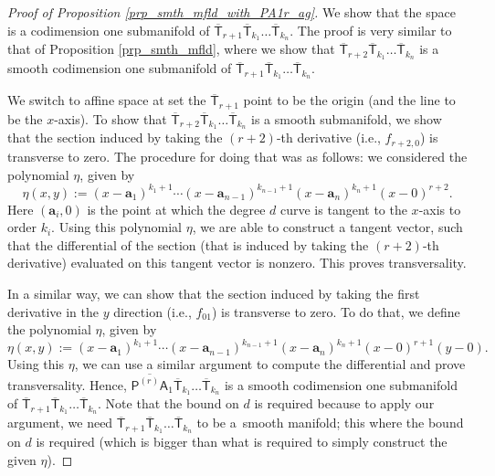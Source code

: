 \documentclass[pdftex]{sigma}
\numberwithin{equation}{section}
\begin{document}
\begin{proof}[Proof of Proposition \ref{prp_smth_mfld_with_PA1r_ag}]
We show that the space  is a codimension one submanifold of
$\overline{\mathsf{T}}_{r+1}\overline{\mathsf{T}}_{k_1}\dots \overline{\mathsf{T}}_{k_n}$.
The proof is very similar to
that of Proposition \ref{prp_smth_mfld}, where we
show that
$\overline{\mathsf{T}}_{r+2}\overline{\mathsf{T}}_{k_1}\dots \overline{\mathsf{T}}_{k_n}$
is a smooth codimension one submanifold
of $\overline{\mathsf{T}}_{r+1}\overline{\mathsf{T}}_{k_1}\dots \overline{\mathsf{T}}_{k_n}$.

We switch to affine space at set the $\overline{\mathsf{T}}_{r+1}$ point to be the origin
(and the line to be the $x$-axis). To show that
$\overline{\mathsf{T}}_{r+2}\overline{\mathsf{T}}_{k_1}\dots \overline{\mathsf{T}}_{k_n}$
is a smooth submanifold, we show that the section induced by taking the $(r+2)$-th
derivative (i.e., $f_{r+2,0}$) is transverse to zero. The procedure for doing that
was as follows: we considered the polynomial $\eta$, given by
\[ \eta(x,y):= (x-\mathbf{a}_1)^{k_1+1} \cdots (x-\mathbf{a}_{n-1})^{k_{n-1}+1} (x-\mathbf{a}_{n})^{k_{n}+1} (x-0)^{r+2}. \]
Here $(\mathbf{a}_i, 0)$ is the point at which the degree $d$ curve is tangent to the
$x$-axis to order $k_i$. Using this polynomial $\eta$, we are able to construct
a tangent vector, such that the differential of the section (that is induced by taking the
$(r+2)$-th derivative) evaluated on this tangent vector is nonzero. This
proves transversality.

In a similar way, we can show that the section
induced by taking the first derivative in the $y$ direction (i.e., $f_{01}$) is transverse
to zero. To do that, we define the polynomial $\eta$, given by
\[ \eta(x,y):= (x-\mathbf{a}_1)^{k_1+1} \cdots (x-\mathbf{a}_{n-1})^{k_{n-1}+1}(x-\mathbf{a}_{n})^{k_{n}+1} (x-0)^{r+1} (y-0). \]
Using this $\eta$, we can use a similar argument to compute the differential and prove transversality.
Hence,
$\overline{\mathsf{P}^{(r)}\mathsf{A}}_1\overline{\mathsf{T}}_{k_1}\dots \overline{\mathsf{T}}_{k_n}$
is a smooth codimension one submanifold of
$\overline{\mathsf{T}}_{r+1}\overline{\mathsf{T}}_{k_1}\dots \overline{\mathsf{T}}_{k_n}$.
Note that the bound on $d$ is required because to apply our argument, we need
$\overline{\mathsf{T}}_{r+1}\overline{\mathsf{T}}_{k_1}\dots \overline{\mathsf{T}}_{k_n}$
to be a~smooth manifold; this where the bound on $d$ is required
(which is bigger than what is required to simply construct the given $\eta$).
\end{proof}
\end{document}
